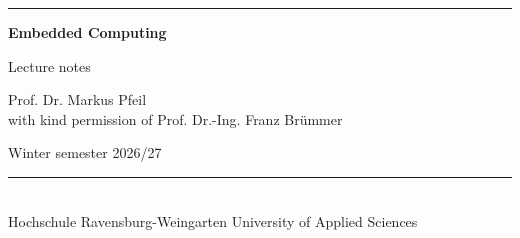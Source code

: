 \thispagestyle{empty}
\enlargethispage{10cm}
{\sffamily
\vspace*{-8mm}
\rwulogo[height=2.2cm]

\vspace*{6.5cm}
{\color{rwuviolet}\rule{\textwidth}{0.8mm}}

\vspace*{8mm}
{\fontsize{34}{40}\selectfont\bfseries\color{rwuviolet} Embedded Computing}

\vspace*{4mm}
{\LARGE\color{rwucyandark} Lecture notes}

\vspace*{12mm}
{\large Prof. Dr. Markus Pfeil}\\[1mm]
{\normalsize\color{rwugray} with kind permission of Prof. Dr.-Ing. Franz Br\"{u}mmer}

\vspace*{6mm}
{\large Winter semester 2026/27}

\vfill
{\color{rwucyan}\rule{\textwidth}{0.4mm}}\\[2mm]
{\small\color{rwugray} Hochschule Ravensburg-Weingarten University of Applied Sciences}
}
\newpage

